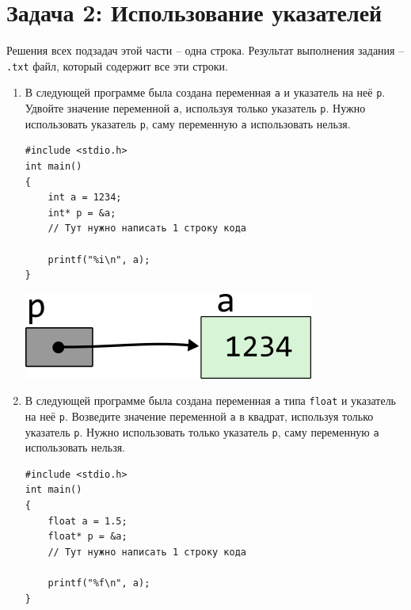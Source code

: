 \documentclass{article}
\begin{document}
\section*{Задача 2: Использование указателей}
Решения всех подзадач этой части -- одна строка. Результат выполнения задания -- \texttt{.txt} файл, который содержит все эти строки.
\begin{enumerate}
\item В следующей программе была создана переменная \texttt{a} и указатель на неё \texttt{p}. Удвойте значение переменной \texttt{a}, используя только указатель \texttt{p}. Нужно использовать указатель \texttt{p}, саму переменную \texttt{a} использовать нельзя.
\begin{multicols}{2}
\begin{lstlisting}
#include <stdio.h>
int main() 
{
    int a = 1234;
    int* p = &a;
    // Тут нужно написать 1 строку кода
    
    printf("%i\n", a);
}
\end{lstlisting}

\vfill \null    
\columnbreak
\vfill \null 

\begin{center}
\vspace{1cm} 
\includegraphics[scale=1]{../images/pointer_schemes/pointer_to_int.png}
\end{center}
\end{multicols}

\item В следующей программе была создана переменная \texttt{a} типа \texttt{float} и указатель на неё \texttt{p}. Возведите значение переменной \texttt{a} в квадрат, используя только указатель \texttt{p}. Нужно использовать только указатель \texttt{p}, саму переменную \texttt{a} использовать нельзя.
\begin{multicols}{2}
\begin{lstlisting}
#include <stdio.h>
int main() 
{
    float a = 1.5;
    float* p = &a;
    // Тут нужно написать 1 строку кода
    
    printf("%f\n", a);
}
\end{lstlisting}

\vfill \null    
\columnbreak
\vfill \null 


\end{multicols}
\end{enumerate}
\end{document}
